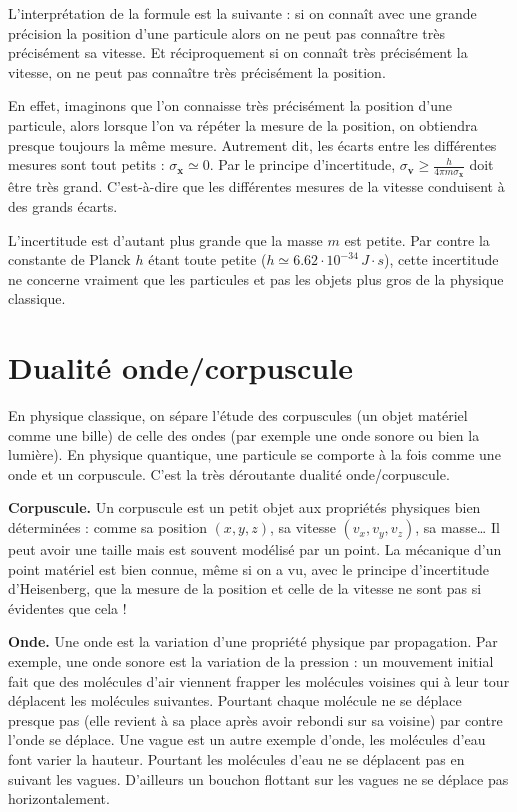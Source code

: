 \documentclass[11pt,class=report,crop=false]{standalone}
\begin{document}
L'interprétation de la formule est la suivante : si on connaît avec une grande précision la position d'une particule alors on ne peut pas connaître très précisément sa vitesse. Et réciproquement si on connaît très précisément la vitesse, on ne peut pas connaître très précisément la position. 

En effet, imaginons que l'on connaisse très précisément la position d'une particule,
alors lorsque l'on va répéter la mesure de la position, on obtiendra presque toujours la même mesure. Autrement dit, les écarts entre les différentes mesures sont tout petits : $\sigma_{\mathbf x} \simeq 0$. Par le principe d'incertitude,
$\sigma_{\mathbf v} \ge \frac{h}{4\pi m\sigma_{\mathbf x}}$
doit être très grand. C'est-à-dire que les différentes mesures de la vitesse conduisent à des grands écarts.

L'incertitude est d'autant plus grande que la masse $m$ est petite. Par contre la constante de Planck $h$ étant toute petite ($h \simeq 6.62 \cdot 10^{-34} \, J\cdot s$), cette incertitude ne concerne vraiment que les particules et pas les objets plus gros de la physique classique.


\section{Dualité onde/corpuscule}


En physique classique, on sépare l'étude des corpuscules (un objet matériel comme une bille) de celle des ondes (par exemple une onde sonore ou bien la lumière). En physique quantique, une particule se comporte à la fois comme une onde et un corpuscule. C'est la très déroutante \og{}dualité onde/corpuscule\fg{}.

\textbf{Corpuscule.} 
Un \og{}corpuscule\fg{} est un petit objet aux propriétés physiques bien déterminées : comme sa position $(x,y,z)$, sa vitesse $(v_x,v_y,v_z)$, sa masse\ldots{} Il peut avoir une taille mais est souvent modélisé par un point.
La mécanique d'un point matériel est bien connue, même si on a vu, avec le principe d'incertitude d'Heisenberg, que la mesure de la position et celle de la vitesse ne sont pas si évidentes que cela !


\textbf{Onde.}
Une \og{}onde\fg{} est la variation d'une propriété physique par propagation. Par exemple, une onde sonore est la variation de la pression : un mouvement initial fait que des molécules d'air viennent frapper les molécules voisines qui à leur tour déplacent les molécules suivantes. Pourtant chaque molécule ne se déplace presque pas (elle revient à sa place après avoir rebondi sur sa voisine) par contre l'onde se déplace.
Une vague est un autre exemple d'onde, les molécules d'eau font varier la hauteur. Pourtant les molécules d'eau ne se déplacent pas en suivant les vagues. D'ailleurs un bouchon flottant sur les vagues ne se déplace pas horizontalement.
\end{document}
